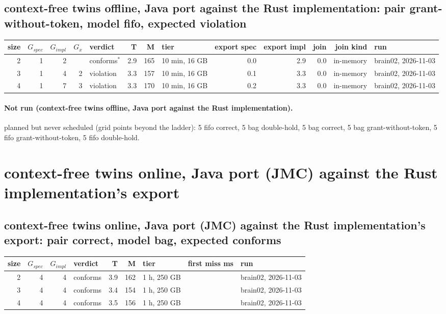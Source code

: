 \documentclass[10pt]{article}
\begin{document}
\subsection*{context-free twins offline, Java port against the Rust implementation: pair \textsf{grant-without-token}, model fifo, expected violation}
\begin{longtable}{@{}rrrrlrrlrrrrl@{}}
\toprule
size & $G_{\mathit{spec}}$ & $G_{\mathit{impl}}$ & $G_x$ & verdict & T & M & tier & export spec & export impl & join & join kind & run \\
\midrule
\endhead
\color{red} 2 & 1 & 2 &  & conforms$^{\ast}$ & 2.9 & 165 & 10 min, 16 GB & 0.0 & 2.9 & 0.0 & in-memory & brain02, 2026-11-03 \\
\color{red} 3 & 1 & 4 & 2 & violation & 3.3 & 157 & 10 min, 16 GB & 0.1 & 3.3 & 0.0 & in-memory & brain02, 2026-11-03 \\
\color{red} 4 & 1 & 7 & 3 & violation & 3.3 & 170 & 10 min, 16 GB & 0.2 & 3.3 & 0.0 & in-memory & brain02, 2026-11-03 \\
\bottomrule
\end{longtable}
\paragraph{Not run (context-free twins offline, Java port against the Rust implementation).}
planned but never scheduled (grid points beyond the ladder): 5 fifo correct, 5 bag double-hold, 5 bag correct, 5 bag grant-without-token, 5 fifo grant-without-token, 5 fifo double-hold.\par
\section*{context-free twins online, Java port (JMC) against the Rust implementation's export}
\subsection*{context-free twins online, Java port (JMC) against the Rust implementation's export: pair \textsf{correct}, model bag, expected conforms}
\begin{longtable}{@{}rrrlrrlrl@{}}
\toprule
size & $G_{\mathit{spec}}$ & $G_{\mathit{impl}}$ & verdict & T & M & tier & first miss ms & run \\
\midrule
\endhead
\color{red} 2 & 4 & 4 & conforms & 3.9 & 162 & 1 h, 250 GB &  & brain02, 2026-11-03 \\
\color{red} 3 & 4 & 4 & conforms & 3.4 & 154 & 1 h, 250 GB &  & brain02, 2026-11-03 \\
\color{red} 4 & 4 & 4 & conforms & 3.5 & 156 & 1 h, 250 GB &  & brain02, 2026-11-03 \\
\bottomrule
\end{longtable}
\end{document}
